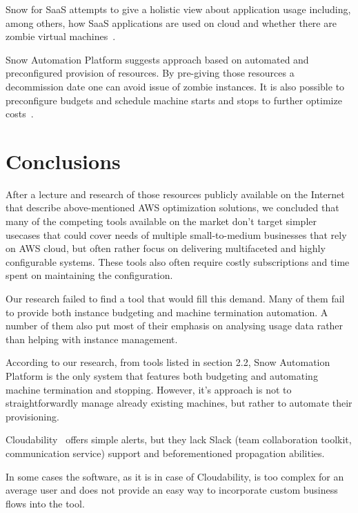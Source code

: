 \documentclass[licencjacka,en]{thesisclass}
\begin{document}
    Snow for SaaS attempts to give a holistic view about application usage
    including, among others, how SaaS applications are used
    on cloud and whether there are zombie virtual machines~\cite{SnowSaaS}.

    Snow Automation Platform suggests approach based on automated
    and preconfigured provision of resources.
    By pre-giving those resources a decommission date one can avoid issue of zombie instances.
    It is also possible to preconfigure budgets and schedule machine starts
    and stops to further optimize costs~\cite{SnowBlog}.

    \section{Conclusions}

    After a lecture and research of those resources publicly available on the Internet
    that describe above-mentioned AWS optimization solutions,
    we concluded that many of the competing tools
    available on the market don't target simpler usecases that could
    cover needs of multiple small-to-medium businesses that rely on AWS cloud,
    but often rather focus on delivering multifaceted and highly configurable systems.
    These tools also often require costly subscriptions and time spent on maintaining
    the configuration.

    Our research failed to find a tool that would fill this demand.
    Many of them fail to provide both instance budgeting and machine termination automation.
    A number of them also put most of their emphasis on analysing usage data rather than
    helping with instance management.

    According to our research, from tools listed in section 2.2, Snow Automation Platform
    is the only system that features both budgeting and automating
    machine termination and stopping.
    However, it's approach is not to straightforwardly manage already existing machines,
    but rather to automate their provisioning.

    Cloudability~\cite{CloudabilityAlerts} offers simple alerts, but they lack
    Slack (team collaboration toolkit, communication service) support
    and beforementioned propagation abilities.

    In some cases the software, as it is in case of Cloudability, is too complex
    for an average user and does not provide an easy way
    to incorporate custom business flows into the tool.
\end{document}
